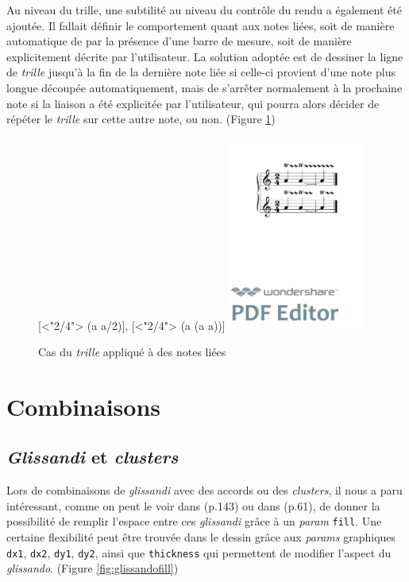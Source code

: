 \documentclass{article}
\newenvironment{gmncode}	{\vspace{-2mm}\small\verbatim}{\endverbatim\vspace{-2mm}}
\newcommand{\code}[1]		{{\small \texttt{#1}}}
\begin{document}
Au niveau du trille, une subtilité au niveau du contr\^ole du rendu a également été ajoutée. Il fallait définir le comportement quant aux notes liées, soit de manière automatique de par la présence d'une barre de mesure, soit de manière explicitement décrite par l'utilisateur. La solution adoptée est de dessiner la ligne de \emph{trille} jusqu'à la fin de la dernière note liée si celle-ci provient d'une note plus longue découpée automatiquement, mais de s'arrêter normalement à la prochaine note si la liaison a été explicitée par l'utilisateur, qui pourra alors décider de répéter le \emph{trille} sur cette autre note, ou non. (Figure \ref{fig:trill})

\begin{figure}[h]
\centering
\begin{gmncode}
{
  [\meter<"2/4"> \trill({a} {a/2})],
  [\meter<"2/4"> \trill({a} \tie({a} {a}))]
}
\end{gmncode}
\includegraphics[width=45mm]{img/trill.pdf}
\caption{Cas du \emph{trille} appliqué à des notes liées}
\label{fig:trill}
\end{figure}

\section{Combinaisons}\label{sec:combinaisons}

\subsection{\emph{Glissandi} et \emph{clusters}}\label{subsec:glissandiCluster}

Lors de combinaisons de \emph{glissandi}  avec des accords ou des \emph{clusters}, il nous a paru intéressant, comme on peut le voir dans \cite{gould2011behind} (p.143) ou dans \cite{stone1980music} (p.61), de donner la possibilité de remplir l'espace entre ces \emph{glissandi} grâce à un \emph{param} \code{fill}. Une certaine flexibilité peut être trouvée dans le dessin grâce aux \emph{params} graphiques \code{dx1}, \code{dx2}, \code{dy1}, \code{dy2}, ainsi que \code{thickness} qui permettent de modifier l'aspect du \emph{glissando}. (Figure \ref{fig:glissandofill})
\end{document}
